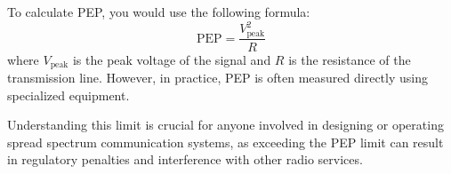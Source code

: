 To calculate PEP, you would use the following formula:
\[
\text{PEP} = \frac{V_{\text{peak}}^2}{R}
\]
where \( V_{\text{peak}} \) is the peak voltage of the signal and \( R \) is the resistance of the transmission line. However, in practice, PEP is often measured directly using specialized equipment.

Understanding this limit is crucial for anyone involved in designing or operating spread spectrum communication systems, as exceeding the PEP limit can result in regulatory penalties and interference with other radio services.

